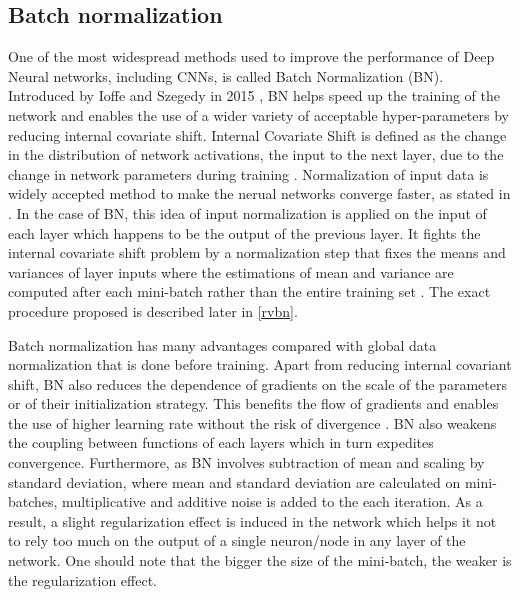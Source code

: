  \subsection{Batch normalization}\label{ssec:bn}
One of the most widespread methods used to improve the performance of Deep Neural networks, including CNNs, is called Batch Normalization (BN). 
Introduced by Ioffe and Szegedy in 2015 \cite{bnIoffeS15}, BN helps speed up the training of the network and enables the use of a wider variety of acceptable hyper-parameters by reducing internal covariate shift. 
Internal Covariate Shift is defined as the change in the distribution of network activations, the input to the next layer, due to the change in network parameters during training \cite{bnIoffeS15}. Normalization of input data is widely accepted method to make the nerual networks converge faster, as stated in \cite{LeCun1998}. In the case of BN, this idea of input normalization is applied on the input of each layer which happens to be the output of the previous layer. It fights the internal covariate shift problem by a normalization step that fixes the means and variances of layer inputs where the estimations of mean and variance are computed
after each mini-batch rather than the entire training set \cite{recent_advances}. The exact procedure proposed is described later in \ref{rvbn}.

Batch normalization has many advantages compared with global data
normalization that is done before training. Apart from reducing internal covariant shift, BN also reduces the dependence of gradients on the scale of the parameters or of their initialization strategy. This benefits the flow of gradients and enables the use of higher learning rate without the risk of divergence \cite{recent_advances}. BN also weakens the coupling between functions of each layers which in turn expedites convergence.  
Furthermore, as BN involves subtraction of mean and scaling by standard deviation, where mean and standard deviation are calculated on mini-batches, multiplicative and additive noise is added to the each iteration. As a result, a slight regularization effect is induced in the network which helps it not to rely too much on the output of a single neuron/node in any layer of the network. One should note that the bigger the size of the mini-batch, the weaker is the regularization effect. 

